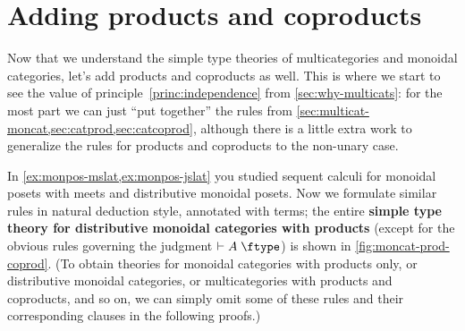 \documentclass{book}
\let\types\vdash
\def\type{\;\ftype}
\begin{document}
\section{Adding products and coproducts}
\label{sec:multicat-prod-coprod}

Now that we understand the simple type theories of multicategories and monoidal categories, let's add products and coproducts as well.
This is where we start to see the value of principle~\eqref{princ:independence} from \cref{sec:why-multicats}: for the most part we can just ``put together'' the rules from \cref{sec:multicat-moncat,sec:catprod,sec:catcoprod}, although there is a little extra work to generalize the rules for products and coproducts to the non-unary case.

In \cref{ex:monpos-mslat,ex:monpos-jslat} you studied sequent calculi for monoidal posets with meets and distributive monoidal posets.
Now we formulate similar rules in natural deduction style, annotated with terms; the entire \textbf{simple type theory for distributive monoidal categories with products} (except for the obvious rules governing the judgment $\types A\type$) is shown in \cref{fig:moncat-prod-coprod}.
(To obtain theories for monoidal categories with products only, or distributive monoidal categories, or multicategories with products and coproducts, and so on, we can simply omit some of these rules and their corresponding clauses in the following proofs.)
\end{document}
